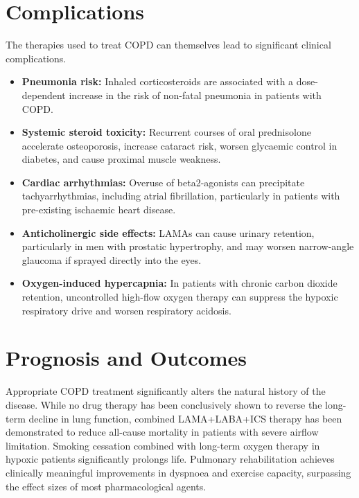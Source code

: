 \section*{Complications}
The therapies used to treat COPD can themselves lead to significant clinical complications.
\begin{itemize}
    \item \textbf{Pneumonia risk:} Inhaled corticosteroids are associated with a dose-dependent increase in the risk of non-fatal pneumonia in patients with COPD.
    \item \textbf{Systemic steroid toxicity:} Recurrent courses of oral prednisolone accelerate osteoporosis, increase cataract risk, worsen glycaemic control in diabetes, and cause proximal muscle weakness.
    \item \textbf{Cardiac arrhythmias:} Overuse of beta2-agonists can precipitate tachyarrhythmias, including atrial fibrillation, particularly in patients with pre-existing ischaemic heart disease.
    \item \textbf{Anticholinergic side effects:} LAMAs can cause urinary retention, particularly in men with prostatic hypertrophy, and may worsen narrow-angle glaucoma if sprayed directly into the eyes.
    \item \textbf{Oxygen-induced hypercapnia:} In patients with chronic carbon dioxide retention, uncontrolled high-flow oxygen therapy can suppress the hypoxic respiratory drive and worsen respiratory acidosis.
\end{itemize}

\section*{Prognosis and Outcomes}
Appropriate COPD treatment significantly alters the natural history of the disease. While no drug therapy has been conclusively shown to reverse the long-term decline in lung function, combined LAMA+LABA+ICS therapy has been demonstrated to reduce all-cause mortality in patients with severe airflow limitation. Smoking cessation combined with long-term oxygen therapy in hypoxic patients significantly prolongs life. Pulmonary rehabilitation achieves clinically meaningful improvements in dyspnoea and exercise capacity, surpassing the effect sizes of most pharmacological agents.

